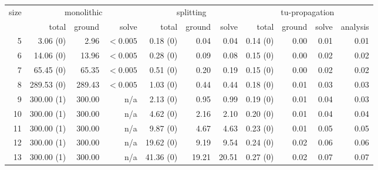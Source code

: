 \documentclass[11pt,fleqn,twoside]{article}
\begin{document}
			\begin{table}[t]
				\small
				\centering
				\setlength\tabcolsep{1.5pt}
				\begin{tabular}[t]{|r|r|r|r|r|r|r|r|r|r|r|}
					\hline
					size & \multicolumn{3}{c|}{monolithic} & \multicolumn{3}{c|}{splitting} & \multicolumn{4}{c|}{tu-propagation} \\
					& total & ground & solve & total & ground & solve & total & ground & solve & analysis \\
					\hline
5     & 3.06 (0) & 2.96     & $<0.005$     & 0.18 (0) & 0.04     & 0.04     & 0.14 (0) & 0.00     & 0.01     & 0.01     \\
6     & 14.06 (0) & 13.96     & $<0.005$     & 0.28 (0) & 0.09     & 0.08     & 0.15 (0) & 0.00     & 0.02     & 0.02     \\
7     & 65.45 (0) & 65.35     & $<0.005$     & 0.51 (0) & 0.20     & 0.19     & 0.15 (0) & 0.00     & 0.02     & 0.02     \\
8     & 289.53 (0) & 289.43     & $<0.005$     & 1.03 (0) & 0.44     & 0.44     & 0.18 (0) & 0.01     & 0.03     & 0.03     \\
9     & 300.00 (1) & 300.00     & n/a     & 2.13 (0) & 0.95     & 0.99     & 0.19 (0) & 0.01     & 0.04     & 0.03     \\
10     & 300.00 (1) & 300.00     & n/a     & 4.62 (0) & 2.16     & 2.10     & 0.20 (0) & 0.01     & 0.04     & 0.04     \\
11     & 300.00 (1) & 300.00     & n/a     & 9.87 (0) & 4.67     & 4.63     & 0.23 (0) & 0.01     & 0.05     & 0.05     \\
12     & 300.00 (1) & 300.00     & n/a     & 19.62 (0) & 9.19     & 9.54     & 0.24 (0) & 0.02     & 0.06     & 0.06     \\
13     & 300.00 (1) & 300.00     & n/a     & 41.36 (0) & 19.21     & 20.51     & 0.27 (0) & 0.02     & 0.07     & 0.07     \\

\end{tabular}
\end{table}
\end{document}
